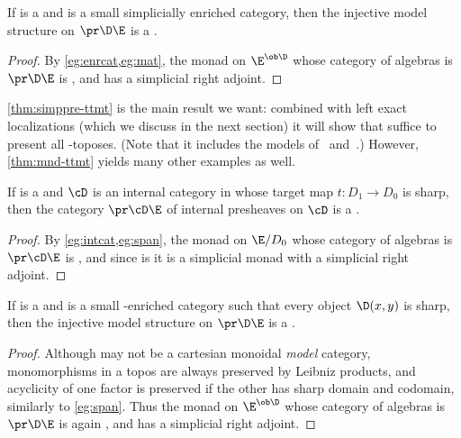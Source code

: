 \begin{cor}\label{thm:simppre-ttmt}
  If \E is a \ttmt and \D is a small simplicially enriched category, then the injective model structure on $\pr\D\E$ is a \ttmt.
\end{cor}
\begin{proof}
  By \cref{eg:enrcat,eg:mat}, the monad on $\E^{\ob\D}$ whose category of algebras is $\pr\D\E$ is \qucoft, and has a simplicial right adjoint.
\end{proof}

\cref{thm:simppre-ttmt} is the main result we want: combined with left exact localizations (which we discuss in the next section) it will show that \ttmts suffice to present all \io-toposes.
(Note that it includes the models of~\cite[]{shulman:invdia} and~\cite{shulman:elreedy}.)
However, \cref{thm:mnd-ttmt} yields many other examples as well.

\begin{cor}\label{thm:intpre-ttmt}
  If \E is a \ttmt and $\cD$ is an internal category in \E whose target map $t:D_1\to D_0$ is sharp, then the category $\pr \cD\E$ of internal presheaves on $\cD$ is a \ttmt.
\end{cor}
\begin{proof}
  By \cref{eg:intcat,eg:span}, the monad on $\E/D_0$ whose category of algebras is $\pr \cD\E$ is \qucoft, and since \E is \slcc it is a simplicial monad with a simplicial right adjoint.
\end{proof}

\begin{cor}\label{thm:enrpre-ttmt}
  If \E is a \ttmt and \D is a small \E-enriched category such that every object $\D(x,y)$ is sharp, then the injective model structure on $\pr\D\E$ is a \ttmt.
\end{cor}
\begin{proof}
  Although \E may not be a cartesian monoidal \emph{model} category, monomorphisms in a topos are always preserved by Leibniz products, and acyclicity of one factor is preserved if the other has sharp domain and codomain, similarly to \cref{eg:span}.
  Thus the monad on $\E^{\ob\D}$ whose category of algebras is $\pr\D\E$ is again \qucoft, and has a simplicial right adjoint.
\end{proof}

